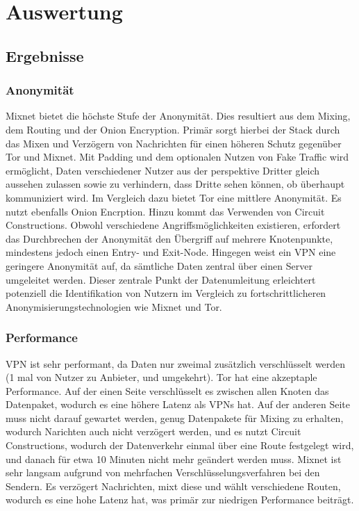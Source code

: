 \section{Auswertung}

\subsection{Ergebnisse}

\subsubsection{Anonymität}

Mixnet bietet die höchste Stufe der Anonymität. Dies resultiert aus dem Mixing, dem Routing und der Onion Encryption. Primär sorgt hierbei der Stack durch das Mixen und Verzögern von Nachrichten für einen höheren Schutz gegenüber Tor und Mixnet. Mit Padding und dem optionalen Nutzen von Fake Traffic wird ermöglicht, Daten verschiedener Nutzer aus der perspektive Dritter gleich aussehen zulassen sowie zu verhindern, dass Dritte sehen können, ob überhaupt kommuniziert wird.
Im Vergleich dazu bietet Tor eine mittlere Anonymität. Es nutzt ebenfalls Onion Encrption. Hinzu kommt das Verwenden von Circuit Constructions. Obwohl verschiedene Angriffsmöglichkeiten existieren, erfordert das Durchbrechen der Anonymität den Übergriff auf mehrere Knotenpunkte, mindestens jedoch einen Entry- und Exit-Node.
Hingegen weist ein VPN eine geringere Anonymität auf, da sämtliche Daten zentral über einen Server umgeleitet werden. Dieser zentrale Punkt der Datenumleitung erleichtert potenziell die Identifikation von Nutzern im Vergleich zu fortschrittlicheren Anonymisierungstechnologien wie Mixnet und Tor.

\subsubsection{Performance}

VPN ist sehr performant, da Daten nur zweimal zusätzlich verschlüsselt werden (1 mal von Nutzer zu Anbieter, und umgekehrt).
Tor hat eine akzeptaple Performance. Auf der einen Seite verschlüsselt es zwischen allen Knoten das Datenpaket, wodurch es eine höhere Latenz als VPNs hat. Auf der anderen Seite muss nicht darauf gewartet werden, genug Datenpakete für Mixing zu erhalten, wodurch Narichten auch nicht verzögert werden, und es nutzt Circuit Constructions, wodurch der Datenverkehr einmal über eine Route festgelegt wird, und danach für etwa 10 Minuten nicht mehr geändert werden muss.
Mixnet ist sehr langsam aufgrund von mehrfachen Verschlüsselungsverfahren bei den Sendern. Es verzögert Nachrichten, mixt diese und wählt verschiedene Routen, wodurch es eine hohe Latenz hat, was primär zur niedrigen Performance beiträgt.

